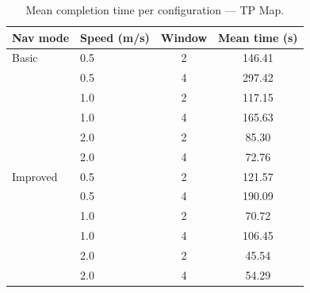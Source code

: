 \begin{table}
    \centering
    \begin{tabular}{llcc}
        \hline
        \textbf{Nav mode} & \textbf{Speed (m/s)} & \textbf{Window} & \textbf{Mean time (s)} \\
        \hline
        Basic             & 0.5                  & 2               & 146.41                 \\
                          & 0.5                  & 4               & 297.42                 \\
                          & 1.0                  & 2               & 117.15                 \\
                          & 1.0                  & 4               & 165.63                 \\
                          & 2.0                  & 2               & 85.30                  \\
                          & 2.0                  & 4               & 72.76                  \\
        Improved          & 0.5                  & 2               & 121.57                 \\
                          & 0.5                  & 4               & 190.09                 \\
                          & 1.0                  & 2               & 70.72                  \\
                          & 1.0                  & 4               & 106.45                 \\
                          & 2.0                  & 2               & 45.54                  \\
                          & 2.0                  & 4               & 54.29                  \\
        \hline
    \end{tabular}
    \caption{Mean completion time per configuration --- TP Map.}
    \label{tab:x_map}
\end{table}

